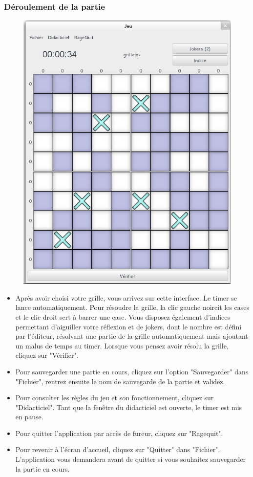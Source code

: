 \documentclass[a4paper, 12pt, twoside]{article}
\begin{document}
\subsubsection{Déroulement de la partie}
\begin{figure}[H]
  \center
  \includegraphics[scale=0.4]{jeu.png}
  \label{jeu}
\end{figure}

\begin{itemize}\setlength{\itemsep}{1mm}
 \item Après avoir choisi votre grille, vous arrivez sur cette interface. Le timer se lance automatiquement. Pour résoudre la grille, la clic gauche noircit les cases et le clic droit sert à barrer une case. Vous disposez également d'indices permettant d'aiguiller votre réflexion et de jokers, dont le nombre est défini par l'éditeur, résolvant une partie de la grille automatiquement mais ajoutant un malus de temps au timer. Lorsque vous pensez avoir résolu la grille, cliquez sur "Vérifier".
 \item Pour sauvegarder une partie en cours, cliquez sur l'option "Sauvegarder" dans "Fichier", rentrez ensuite le nom de sauvegarde de la partie et validez.
\item Pour consulter les règles du jeu et son fonctionnement, cliquez sur "Didacticiel". Tant que la fenêtre du didacticiel est ouverte, le timer est mis en pause.
 \item Pour quitter l'application par accès de fureur, cliquez sur "Ragequit".
 \item Pour revenir à l'écran d'accueil, cliquez sur "Quitter" dans "Fichier". L'application vous demandera avant de quitter si vous souhaitez sauvegarder la partie en cours.
\end{itemize}
\end{document}
